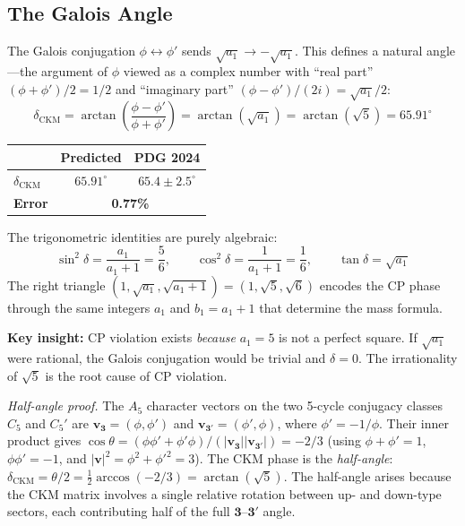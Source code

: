 \documentclass[12pt,a4paper]{article}
\theoremstyle{definition}
\begin{document}

\subsection{The Galois Angle}

The Galois conjugation $\phi \leftrightarrow \phi'$ sends $\sqrt{a_1} \to -\sqrt{a_1}$. This defines a natural angle---the argument of $\phi$ viewed as a complex number with ``real part'' $(\phi + \phi')/2 = 1/2$ and ``imaginary part'' $(\phi - \phi')/(2i) = \sqrt{a_1}/2$:
\begin{equation}
\boxed{\delta_{\text{CKM}} = \arctan\!\left(\frac{\phi - \phi'}{\phi + \phi'}\right) = \arctan(\sqrt{a_1}) = \arctan(\sqrt{5}) = 65.91^\circ}
\label{eq:cp_ckm}
\end{equation}

\begin{center}
\begin{tabular}{lcc}
\toprule
& \textbf{Predicted} & \textbf{PDG 2024} \\
\midrule
$\delta_{\text{CKM}}$ & $65.91^\circ$ & $65.4 \pm 2.5^\circ$ \\
\textbf{Error} & \multicolumn{2}{c}{\textbf{0.77\%}} \\
\bottomrule
\end{tabular}
\end{center}

The trigonometric identities are purely algebraic:
\begin{equation}
\sin^2\delta = \frac{a_1}{a_1+1} = \frac{5}{6}, \qquad \cos^2\delta = \frac{1}{a_1+1} = \frac{1}{6}, \qquad \tan\delta = \sqrt{a_1}
\end{equation}
The right triangle $(1, \sqrt{a_1}, \sqrt{a_1+1}) = (1, \sqrt{5}, \sqrt{6})$ encodes the CP phase through the same integers $a_1$ and $b_1 = a_1 + 1$ that determine the mass formula.

\textbf{Key insight:} CP violation exists \emph{because} $a_1 = 5$ is not a perfect square. If $\sqrt{a_1}$ were rational, the Galois conjugation would be trivial and $\delta = 0$. The irrationality of $\sqrt{5}$ is the root cause of CP violation.

\textit{Half-angle proof.}  The $A_5$ character vectors on the two 5-cycle conjugacy classes $C_5$ and $C_5'$ are $\mathbf{v}_{\mathbf{3}} = (\phi, \phi')$ and $\mathbf{v}_{\mathbf{3'}} = (\phi', \phi)$, where $\phi' = -1/\phi$.  Their inner product gives $\cos\theta = (\phi\phi' + \phi'\phi)/(|\mathbf{v}_{\mathbf{3}}||\mathbf{v}_{\mathbf{3'}}|) = -2/3$ (using $\phi + \phi' = 1$, $\phi\phi' = -1$, and $|\mathbf{v}|^2 = \phi^2 + \phi'^2 = 3$).  The CKM phase is the \emph{half-angle}: $\delta_{\text{CKM}} = \theta/2 = \tfrac{1}{2}\arccos(-2/3) = \arctan(\sqrt{5})$.  The half-angle arises because the CKM matrix involves a single relative rotation between up- and down-type sectors, each contributing half of the full $\mathbf{3}$--$\mathbf{3'}$ angle.
\end{document}
